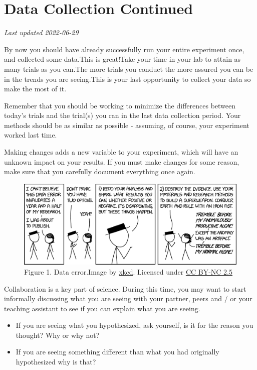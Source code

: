 \documentclass[
]{book}
\providecommand{\tightlist}{%
  \setlength{\itemsep}{0pt}\setlength{\parskip}{0pt}}
\begin{document}
\hypertarget{data-collection-continued}{%
\chapter*{Data Collection Continued}\label{data-collection-continued}}

\emph{Last updated 2022-06-29}

By now you should have already successfully run your entire experiment once, and collected some data.This is great!Take your time in your lab to attain as many trials as you can.The more trials you conduct the more assured you can be in the trends you are seeing.This is your last opportunity to collect your data so make the most of it.

Remember that you should be working to minimize the differences between today's trials and the trial(s) you ran in the last data collection period. Your methods should be as similar as possible - assuming, of course, your experiment worked last time.

Making changes adds a new variable to your experiment, which will have an unknown impact on your results. If you must make changes for some reason, make sure that you carefully document everything once again.

\begin{figure}
\centering
\includegraphics{figures_images/Lab8-Fig1.png}
\caption{Figure 1. Data error.Image by \href{https://xkcd.com/2239/}{xkcd}. Licensed under \href{https://creativecommons.org/licenses/by-nc/2.5/}{CC BY-NC 2.5}}
\end{figure}

Collaboration is a key part of science. During this time, you may want to start informally discussing what you are seeing with your partner, peers and / or your teaching assistant to see if you can explain what you are seeing.

\begin{itemize}
\tightlist
\item
  If you are seeing what you hypothesized, ask yourself, is it for the reason you thought? Why or why not?
\item
  If you are seeing something different than what you had originally hypothesized why is that?
\end{itemize}
\end{document}
